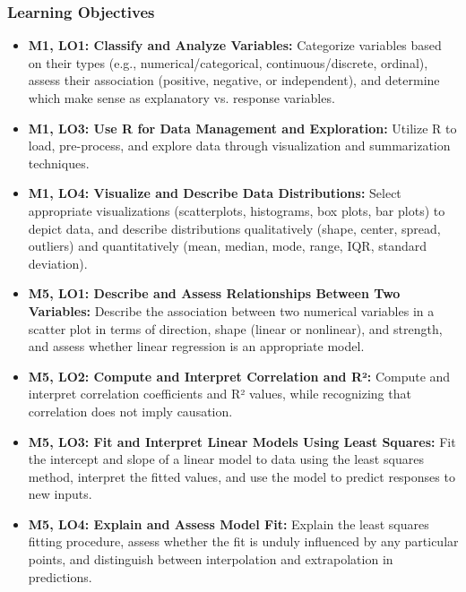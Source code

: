 \begin{frame}
    \frametitle{Learning Objectives}
    \begin{itemize}
        \item \textbf{M1, LO1: Classify and Analyze Variables:} Categorize variables based on their types (e.g., numerical/categorical, continuous/discrete, ordinal), assess their association (positive, negative, or independent), and determine which make sense as explanatory vs. response variables.
        \item \textbf{M1, LO3: Use R for Data Management and Exploration:} Utilize R to load, pre-process, and explore data through visualization and summarization techniques.
        \item \textbf{M1, LO4: Visualize and Describe Data Distributions:} Select appropriate visualizations (scatterplots, histograms, box plots, bar plots) to depict data, and describe distributions qualitatively (shape, center, spread, outliers) and quantitatively (mean, median, mode, range, IQR, standard deviation).
        \item \textbf{M5, LO1: Describe and Assess Relationships Between Two Variables:} Describe the association between two numerical variables in a scatter plot in terms of direction, shape (linear or nonlinear), and strength, and assess whether linear regression is an appropriate model.    
        \item \textbf{M5, LO2: Compute and Interpret Correlation and R²:} Compute and interpret correlation coefficients and R² values, while recognizing that correlation does not imply causation. 
        \item \textbf{M5, LO3: Fit and Interpret Linear Models Using Least Squares:} Fit the intercept and slope of a linear model to data using the least squares method, interpret the fitted values, and use the model to predict responses to new inputs.
        \item \textbf{M5, LO4: Explain and Assess Model Fit:} Explain the least squares fitting procedure, assess whether the fit is unduly influenced by any particular points, and distinguish between interpolation and extrapolation in predictions.
    \end{itemize}
\end{frame}
    
